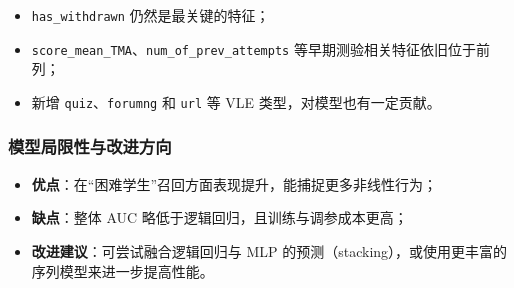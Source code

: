 \documentclass{SYSUReport}
\begin{document}
\begin{itemize}
  \item \texttt{has\_withdrawn} 仍然是最关键的特征；  
  \item \texttt{score\_mean\_TMA}、\texttt{num\_of\_prev\_attempts} 等早期测验相关特征依旧位于前列；  
  \item 新增 \texttt{quiz}、\texttt{forumng} 和 \texttt{url} 等 VLE 类型，对模型也有一定贡献。
\end{itemize}

\subsubsection{模型局限性与改进方向}
\begin{itemize}
  \item \textbf{优点}：在“困难学生”召回方面表现提升，能捕捉更多非线性行为；  
  \item \textbf{缺点}：整体 AUC 略低于逻辑回归，且训练与调参成本更高；  
  \item \textbf{改进建议}：可尝试融合逻辑回归与 MLP 的预测（stacking），或使用更丰富的序列模型来进一步提高性能。
\end{itemize}
\end{document}
